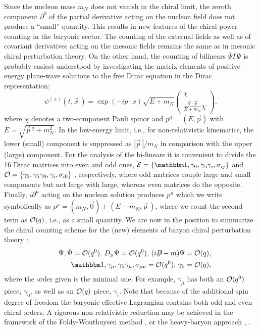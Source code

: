 \documentclass[twoside,12pt]{article}
\begin{document}
   Since the nucleon mass $m_N$ does not vanish in the chiral limit, the
zeroth component $\partial^0$ of the partial derivative acting on the nucleon
field does not produce a ``small'' quantity.
   This results in new features of the chiral power counting in the
baryonic sector.
   The counting of the external fields as well as of covariant derivatives
acting on the mesonic fields remains the same as in mesonic chiral
perturbation theory.
   On the other hand, the counting of bilinears $\bar{\Psi}\Gamma\Psi$ is
probably easiest understood by investigating the matrix elements of
positive-energy plane-wave solutions to the free Dirac equation in the
Dirac representation:
\begin{equation}
\psi^{(+)}(t,\vec{x}\,)=\exp(-ip\cdot x) \sqrt{E+m_N}\left(
\begin{array}{c}
\chi\\
\frac{\vec{\sigma}\cdot\vec{p}}{E+m_N}\chi
\end{array}
\right),
\end{equation}
where $\chi$ denotes a two-component Pauli
spinor and $p^\mu=(E,\vec{p})$ with $E=\sqrt{\vec{p}\,^2+m_N^2}$.
   In the low-energy limit, i.e., for non-relativistic kinematics, the lower
(small) component is suppressed as $|\vec{p}\,|/m_N$ in comparison with the
upper (large) component.
   For the analysis of the bi-linears it is convenient
to divide the 16 Dirac matrices into even and odd ones, ${\cal E}=
\{{\mathbbm 1}, \gamma_0,\gamma_5 \gamma_i,\sigma_{ij}\}$ and ${\cal
O}=\{\gamma_5,\gamma_5 \gamma_0,\gamma_i,\sigma_{i0}\}$
\cite{Foldy:1949wa}, respectively, where odd
matrices couple large and small components but not large with
large, whereas even matrices do the opposite.
   Finally, $i\partial^\mu$ acting on the nucleon solution produces $p^\mu$
which we write symbolically as $p^\mu=(m_N,\vec{0})+(E-m_N,\vec{p}\,)$,
where we count the second term as ${\cal O}(q)$, i.e., as a small quantity.
   We are now in the position to summarize the chiral counting scheme for
the (new) elements of baryon chiral perturbation theory \cite{Krause:1990xc}:
\begin{eqnarray}
\label{4:1:2:powercounting}
&&\Psi,\bar{\Psi} =  {\cal O}(q^0),\, D_{\mu} \Psi = {\cal  O}(q^0),\,
(iD\hspace{-.6em}/ - m)\Psi={\cal O}(q),\nonumber\\
&&{\mathbbm 1},\gamma_\mu,\gamma_5\gamma_\mu,\sigma_{\mu\nu}={\cal O}(q^0),\,
\gamma_5 ={\cal O}(q),
\end{eqnarray}
   where the order given is the minimal one.
   For example, $\gamma_\mu$ has both an ${\cal O}(q^0)$ piece, $\gamma_0$,
as well as an ${\cal O}(q)$ piece, $\gamma_i$.
   Note that because of the additional spin degree of freedom the baryonic
effective Lagrangian contains both odd and even chiral orders.
   A rigorous non-relativistic reduction may be achieved in the framework
of the Foldy-Wouthuysen method \cite{Foldy:1949wa}, \cite{Fearing:1993ii} or the
heavy-baryon approach \cite{Jenkins:1990jv}, \cite{Bernard:1992qa}.
\end{document}
